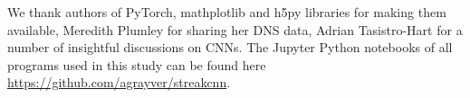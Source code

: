 \documentclass{svjour3}                     %
\begin{document}
\begin{acknowledgements}
We thank authors of PyTorch, mathplotlib and h5py libraries for making them available, Meredith Plumley for sharing her DNS data, Adrian Tasistro-Hart for a number of insightful discussions on CNNs. The Jupyter Python notebooks of all programs used in this study can be found here \url{https://github.com/agrayver/streakcnn}.
\end{acknowledgements}




\end{document}
